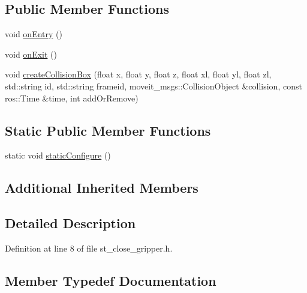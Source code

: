\subsection*{Public Member Functions}
\begin{DoxyCompactItemize}
\item 
void \hyperlink{structsm__moveit__4_1_1pick__states_1_1StCloseGripper_a8d208da87aa5bc3758b3769fe56b5c42}{on\+Entry} ()
\item 
void \hyperlink{structsm__moveit__4_1_1pick__states_1_1StCloseGripper_a427f4aec6a2173899b55e6a45ca28773}{on\+Exit} ()
\item 
void \hyperlink{structsm__moveit__4_1_1pick__states_1_1StCloseGripper_a7522e4d331379b935519d24fd34ce39d}{create\+Collision\+Box} (float x, float y, float z, float xl, float yl, float zl, std\+::string id, std\+::string frameid, moveit\+\_\+msgs\+::\+Collision\+Object \&collision, const ros\+::\+Time \&time, int add\+Or\+Remove)
\end{DoxyCompactItemize}
\subsection*{Static Public Member Functions}
\begin{DoxyCompactItemize}
\item 
static void \hyperlink{structsm__moveit__4_1_1pick__states_1_1StCloseGripper_a5076328fb91d79beac4b1910aee86b05}{static\+Configure} ()
\end{DoxyCompactItemize}
\subsection*{Additional Inherited Members}


\subsection{Detailed Description}


Definition at line 8 of file st\+\_\+close\+\_\+gripper.\+h.



\subsection{Member Typedef Documentation}
\mbox{\label{structsm__moveit__4_1_1pick__states_1_1StCloseGripper_a6934886ed914236301c2341e96264729}} 
